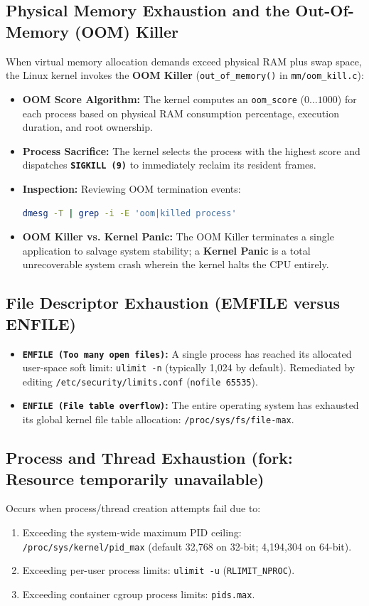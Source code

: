 \subsection{Physical Memory Exhaustion and the Out-Of-Memory (OOM) Killer}
When virtual memory allocation demands exceed physical RAM plus swap space, the Linux kernel invokes the \textbf{OOM Killer} (\texttt{out\_of\_memory()} in \texttt{mm/oom\_kill.c}):
\begin{itemize}
    \item \textbf{OOM Score Algorithm:} The kernel computes an \texttt{oom\_score} ($0 \dots 1000$) for each process based on physical RAM consumption percentage, execution duration, and root ownership.
    \item \textbf{Process Sacrifice:} The kernel selects the process with the highest score and dispatches \textbf{\texttt{SIGKILL (9)}} to immediately reclaim its resident frames.
    \item \textbf{Inspection:} Reviewing OOM termination events:
\begin{lstlisting}[language=bash]
dmesg -T | grep -i -E 'oom|killed process'
\end{lstlisting}
    \item \textbf{OOM Killer vs. Kernel Panic:} The OOM Killer terminates a single application to salvage system stability; a \textbf{Kernel Panic} is a total unrecoverable system crash wherein the kernel halts the CPU entirely.
\end{itemize}

\subsection{File Descriptor Exhaustion (EMFILE versus ENFILE)}
\begin{itemize}
    \item \textbf{\texttt{EMFILE (Too many open files)}:} A single process has reached its allocated user-space soft limit: \texttt{ulimit -n} (typically 1,024 by default). Remediated by editing \texttt{/etc/security/limits.conf} (\texttt{nofile 65535}).
    \item \textbf{\texttt{ENFILE (File table overflow)}:} The entire operating system has exhausted its global kernel file table allocation: \texttt{/proc/sys/fs/file-max}.
\end{itemize}

\subsection{Process and Thread Exhaustion (fork: Resource temporarily unavailable)}
Occurs when process/thread creation attempts fail due to:
\begin{enumerate}
    \item Exceeding the system-wide maximum PID ceiling: \texttt{/proc/sys/kernel/pid\_max} (default 32,768 on 32-bit; 4,194,304 on 64-bit).
    \item Exceeding per-user process limits: \texttt{ulimit -u} (\texttt{RLIMIT\_NPROC}).
    \item Exceeding container cgroup process limits: \texttt{pids.max}.
\end{enumerate}

